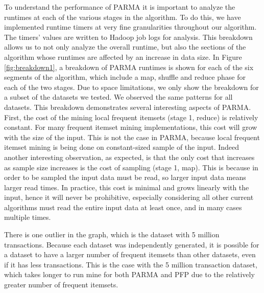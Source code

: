 To understand the performance of PARMA it is important to analyze the
runtimes at each of the various stages in the algorithm. To do this, we
have implemented runtime timers at very fine granularities throughout
our algorithm. The timers' values are written to Hadoop job logs for
analysis. This breakdown allows us to not only analyze the overall
runtime, but also the sections of the algorithm whose runtimes are
affected by an increase in data size. In Figure \ref{fig:breakdown1}, a
breakdown of PARMA runtimes is shown for each of the six segments of the
algorithm, which include a map, shuffle and reduce phase for each of the
two stages. 
Due to space limitations, we only show the breakdown for a subset of
the datasets we tested. We observed the same patterns for all datasets.
This breakdown demonstrates several interesting aspects of
PARMA. First, the cost of the mining local frequent itemsets (stage 1,
reduce) is relatively constant. For many frequent itemset mining
implementations, this cost will grow with the size of the input. This is
not the case in PARMA, because local frequent itemset mining is being
done on constant-sized sample of the input. Indeed another interesting
observation, as expected, is that the only cost that increases as sample
size increases is the cost of sampling (stage 1, map). This is because
in order to be sampled the input data must be read, so larger input data
means larger read times. In practice, this cost is minimal and
grows linearly with the input, hence it will never be prohibitive,
especially considering all other current algorithms must read the entire
input data at least once, and in many cases multiple times. 

There is one outlier in the graph, which is the dataset with 5 million
transactions. Because each dataset was independently generated, it is
possible for a dataset to have a larger number of frequent itemsets than
other datasets, even if it has less transactions. This is the case with
the 5 million transaction dataset, which takes longer to run mine for both PARMA and PFP
due to the relatively greater number of frequent itemsets. 

